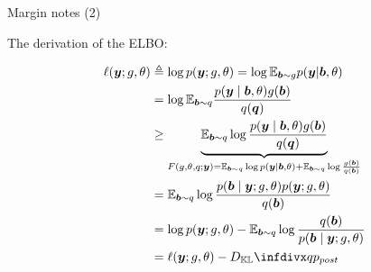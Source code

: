 \documentclass[10pt]{beamer}
\begin{document}
        
\begin{frame}{Margin notes (2)}

        The derivation of the ELBO:
        
        \begin{align}
            \ell(\bm{y};g,\theta) 
            & \triangleq \log p(\bm{y};g,\theta) 
            = \log\mathbb{E}_{\bm{b}\sim g}p(\bm{y}|\bm{b},\theta) \\
            & = \log\mathbb{E}_{\bm{b}\sim q} \frac{p(\bm{y}\mid \bm{b},\theta)g(\bm{b})}{q(\bm{q})} \\
            & \geq \underbrace{\mathbb{E}_{\bm{b}\sim q} \log \frac{p(\bm{y}\mid \bm{b},\theta)g(\bm{b})}{q(\bm{q})}}_{
            F(g,\theta,q;\bm{y}) = \mathbb{E}_{\bm{b}\sim q} \log p(\bm{y}\mid\bm{b},\theta) + \mathbb{E}_{\bm{b}\sim q}\log\frac{g(\bm{b})}{q(\bm{b})}} \\
            & = \mathbb{E}_{\bm{b}\sim q} \log\frac{p(\bm{b}\mid\bm{y};g,\theta)p(\bm{y};g,\theta)}{q(\bm{b})} \\
            & = \log p(\bm{y};g,\theta) - \mathbb{E}_{\bm{b}\sim q} \log\frac{q(\bm{b})}{p(\bm{b}\mid\bm{y};g,\theta)} \\
            & = \ell(\bm{y};g,\theta) - \infdiv{q}{p_{post}}
        \end{align}


\end{frame}
\end{document}
